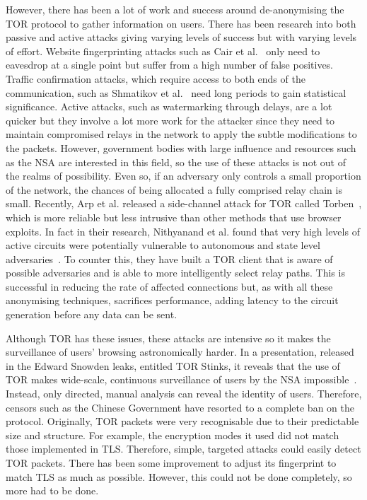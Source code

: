 \documentclass[ %
                    author={Samuel Russell},
                supervisor={Prof. Bogdan Warinschi},
                    degree={MEng},
                     title={Innocuous Ciphertexts},
                  subtitle={The DE-CENSOR Scheme},
                      type={Research},
                      year={2018} ]{dissertation}
\begin{document}
However, there has been a lot of work and success around de-anonymising the TOR protocol to gather information on users. There has been research into both passive and active attacks giving varying levels of success but with varying levels of effort. Website fingerprinting attacks such as Cair et al.~\cite{webfinger} only need to eavesdrop at a single point but suffer from a high number of false positives. Traffic confirmation attacks, which require access to both ends of the communication, such as Shmatikov et al.~\cite{conf} need long periods to gain statistical significance. Active attacks, such as watermarking through delays, are a lot quicker but they involve a lot more work for the attacker since they need to maintain compromised relays in the network to apply the subtle modifications to the packets. However, government bodies with large influence and resources such as the NSA are interested in this field, so the use of these attacks is not out of the realms of possibility. Even so, if an adversary only controls a small proportion of the network, the chances of being allocated a fully comprised relay chain is small. Recently, Arp et al. released a side-channel attack for TOR called Torben~\cite{torben}, which is more reliable but less intrusive than other methods that use browser exploits. In fact in their research, Nithyanand et al. found that very high levels of active circuits were potentially vulnerable to autonomous and state level adversaries~\cite{AS}. To counter this, they have built a TOR client that is aware of possible adversaries and is able to more intelligently select relay paths. This is successful in reducing the rate of affected connections but, as with all these anonymising techniques, sacrifices performance, adding latency to the circuit generation before any data can be sent.

Although TOR has these issues, these attacks are intensive so it makes the surveillance of users' browsing astronomically harder.
In a presentation, released in the Edward Snowden leaks, entitled TOR Stinks, it reveals that the use of TOR makes wide-scale, continuous surveillance of users by the NSA impossible~\cite{tor_stinks}.
Instead, only directed, manual analysis can reveal the identity of users.
Therefore, censors such as the Chinese Government have resorted to a complete ban on the protocol.
Originally, TOR packets were very recognisable due to their predictable size and structure.
For example, the encryption modes it used did not match those implemented in TLS.
Therefore, simple, targeted attacks could easily detect TOR packets.
There has been some improvement to adjust its fingerprint to match TLS as much as possible. However, this could not be done completely, so more had to be done.
\end{document}
